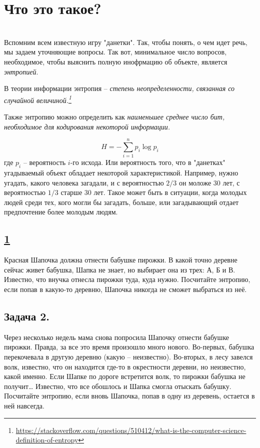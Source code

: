 \section*{Что это такое?}~\
\\

Вспомним всем известную игру "данетки". Так, чтобы понять, о чем идет речь, мы задаем уточняющие вопросы. Так вот, минимальное число вопросов, необходимое, чтобы выяснить полную инофрмацию об объекте, является \textit{энтропией}.

В теории информации энтропия -- \textit{степень неопределенности, связанная со случайной величиной.\footnote{\url{https://stackoverflow.com/questions/510412/what-is-the-computer-science-definition-of-entropy}}}

Также энтропию можно определить как \textit{наименьшее среднее число бит, необходимое для кодирования некоторой информации.}

\[H=-\sum\limits_{i=1}^n p_i\log p_i \]
где $p_i$ -- вероятность $i$-го исхода. Или вероятность того, что в "данетках" угадываемый объект обладает некоторой характеристикой. Например, нужно угадать, какого человека загадали, и с вероятностью $2/3$ он моложе 30 лет, с вероятностью $1/3$ старше 30 лет. Такое может быть в ситуации, когда молодых людей среди тех, кого могли бы загадать, больше, или загадывающий отдает предпочтение более молодым людям. 

\subsection*{\hyperref[sec:sol_problem1]{1 }}\label{sec:problem1} 
Красная Шапочка должна отнести бабушке пирожки. В какой точно деревне сейчас живет бабушка, Шапка не знает, но выбирает она из трех: А, Б и В. Известно, что внучка отнесла пирожки туда, куда нужно. Посчитайте энтропию, если попав в какую-то деревню, Шапочка никогда не сможет выбраться из неё.

\subsection*{Задача 2.} Через несколько недель мама снова попросила Шапочку отнести бабушке пирожки. Правда, за все это время произошло много нового. Во-первых, бабушка перекочевала в другую деревню (какую – неизвестно). Во-вторых, в лесу завелся волк, известно, что он находится где-то в окрестности деревни, но неизвестно, какой именно. Если Шапке по дороге встретится волк, то пирожки бабушка не получит… Известно, что все обошлось и Шапка смогла отыскать бабушку. Посчитайте энтропию, если вновь Шапочка, попав в одну из деревень, остается в ней навсегда.

